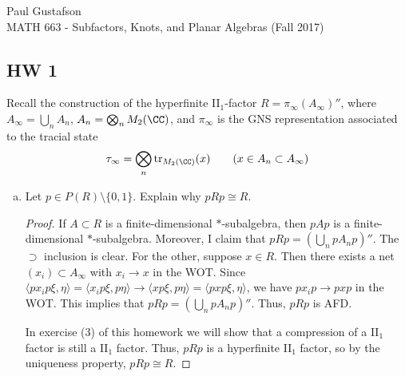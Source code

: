 \documentclass{article}
\begin{document}
\noindent Paul Gustafson\\
\noindent MATH 663 - Subfactors, Knots, and Planar Algebras (Fall 2017)

\subsection*{HW 1}
 Recall the construction of the hyperfinite II$_1$-factor $R = \pi_\infty(A_\infty)''$, where $A_\infty = \bigcup_n A_n$, $A_n = \bigotimes_n M_2(\CC)$, and $\pi_\infty$ is the GNS representation associated to the tracial state
$$ \tau_\infty = \bigotimes_n \Tr_{M_2(\CC)}(x) \qquad (x \in A_n \subset A_\infty) $$
\begin{enumerate}[(a)]
\item Let $p \in P(R)\setminus \{0,1\}$. Explain why $pRp \cong R$.
  \begin{proof}
    If $A \subset R$ is a finite-dimensional $*$-subalgebra, then $pAp$ is a finite-dimensional $*$-subalgebra.
    Moreover, I claim that $pRp = \left( \bigcup_n pA_np \right)''$. The $\supset$ inclusion is clear.  For the
    other, suppose $x \in R$.  Then there exists a net $(x_i) \subset A_\infty$ with $x_i \to x$ in the WOT.
    Since $\langle p x_i p \xi, \eta \rangle = \langle x_i p \xi, p \eta \rangle \to \langle x p \xi, p \eta \rangle = \langle pxp \xi, \eta \rangle$, we have $px_ip \to pxp$ in the WOT.  This implies that $pRp = \left( \bigcup_n pA_np \right)''$.   Thus, $pRp$ is AFD.

    In exercise (3) of this homework we will show that a compression of a II$_1$ factor is still a II$_1$ factor.   Thus,  $pRp$ is a hyperfinite II$_1$ factor, so by the uniqueness property, $pRp \cong R$.   
  \end{proof}


\end{enumerate}
\end{document}
